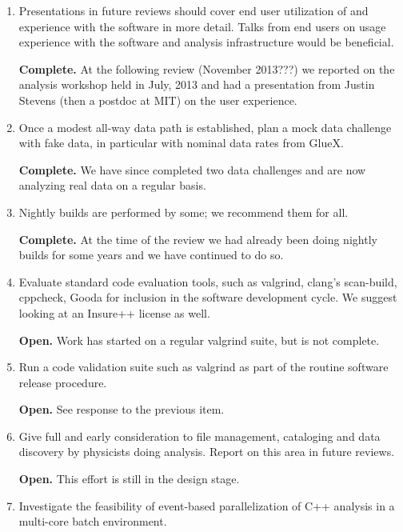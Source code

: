 \documentclass[12pt]{article}
\begin{document}
\begin{enumerate}

\item Presentations in future reviews should cover end user
  utilization of and experience with the software in more
  detail. Talks from end users on usage experience with the software
  and analysis infrastructure would be beneficial.

  {\bf Complete.} At the following review (November 2013???) we
  reported on the analysis workshop held in July, 2013 and had a
  presentation from Justin Stevens (then a postdoc at MIT) on the user
  experience.

\item Once a modest all-way data path is established, plan a mock data
  challenge with fake data, in particular with nominal data rates from
  GlueX.

  {\bf Complete.} We have since completed two data challenges and are
  now analyzing real data on a regular basis.

\item Nightly builds are performed by some; we recommend them for all.

  {\bf Complete.} At the time of the review we had already been doing
  nightly builds for some years and we have continued to do so.

\item Evaluate standard code evaluation tools, such as valgrind,
  clang's scan-build, cppcheck, Gooda for inclusion in the software
  development cycle. We suggest looking at an Insure++ license as
  well.

  {\bf Open.} Work has started on a regular valgrind suite, but is not complete.

\item Run a code validation suite such as valgrind as part of the
  routine software release procedure.

  {\bf Open.} See response to the previous item.

\item Give full and early consideration to file management, cataloging
  and data discovery by physicists doing analysis. Report on this area
  in future reviews.

  {\bf Open.} This effort is still in the design stage.

\item Investigate the feasibility of event-based parallelization of
  C++ analysis in a multi-core batch environment.


\end{enumerate}
\end{document}
